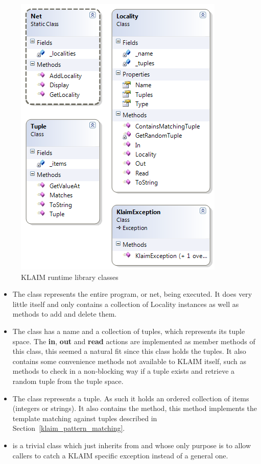 	\begin{figure}[ht!]
		\centering
		\includegraphics[scale=0.6]{klaim_runtime.png}
		\caption{KLAIM runtime library classes}
		\label{fig:klaim_runtime}
	\end{figure}
	
	\begin{itemize}
	
	\item The  class represents the entire program, or net, being 
	executed. It does very little itself and only contains a collection of 
	\textsf{Locality} instances as well as methods to add and delete them. 
	
	\item The  class has a name and a collection of tuples, 
	which represents its tuple space. The \textbf{in}, \textbf{out} and 
	\textbf{read} actions are implemented as member methods of this class, this 
	seemed a natural fit since this class holds the tuples. It also contains 
	some convenience methods not available to KLAIM itself, such as methods to 
	check in a non-blocking way if a tuple exists and retrieve a random tuple 
	from the tuple space.

	\item The  class represents a tuple. As such it holds an 
	ordered collection of items (integers or strings). It also contains the 
	 method, this method implements the template matching 
	against tuples described in Section~\ref{klaim_pattern_matching}.
	
	\item {} is a trivial class which just inherits from 
	 and whose only purpose is to allow callers to 
	catch a KLAIM specific exception instead of a general one.
	
	\end{itemize}
	
